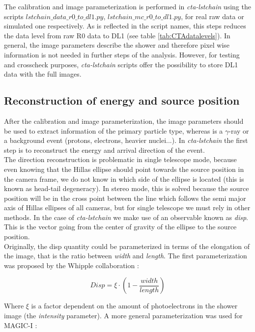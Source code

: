 \documentclass[main.tex]{subfiles}
\begin{document}
The calibration and image parameterization is performed in \textit{cta-lstchain} using the scripts \textit{$lstchain\_data\_r0\_to\_dl1.py$}, \textit{$lstchain\_mc\_r0\_to\_dl1.py$}, for real raw data or simulated one respectively. As is reflected in the script names, this steps reduces the data level from raw R0 data to DL1 (see table \ref{tab:CTAdatalevels}). In general, the image parameters describe the shower and therefore pixel wise information is not needed in further steps of the analysis. However, for testing and crosscheck purposes, \textit{cta-lstchain} scripts offer the possibility to store DL1 data with the full images.


\subsection{Reconstruction of energy and source position} \label{sec:recoe}

After the calibration and image parameterization, the image parameters should be used to extract information of the primary particle type, whereas is a $\gamma$-ray or a background event (protons, electrons, heavier nuclei...). In \textit{cta-lstchain} the first step is to reconstruct the energy and arrival direction of the event.\\ 
The direction reconstruction is problematic in single telescope mode, because even knowing that the Hillas ellipse should point towards the source position in the camera frame, we do not know in which side of the ellipse is located (this is known as head-tail degeneracy). In stereo mode, this is solved because the source position will be in the cross point between the line which follows the semi major axis of Hillas ellipses of all cameras, but for single telescope we must rely in other methods. In the case of \textit{cta-lstchain} we make use of an observable known as \textit{disp}. This is the vector going from the center of gravity of the ellipse to the source position.\\
Originally, the disp quantity could be parameterized in terms of the elongation of the image, that is the ratio between \textit{width} and \textit{length}. The first parameterization was proposed by the Whipple collaboration \cite{1994dispwhipple}:

\begin{equation}
  Disp = \xi \cdot \left(1 - \frac{width}{length}  \right)
\end{equation}

Where $\xi$ is a factor dependent on the amount of photoelectrons in the shower image (the \textit{intensity} parameter). A more general parameterization was used for MAGIC-I \cite{2005DISPmagic}:
\end{document}
